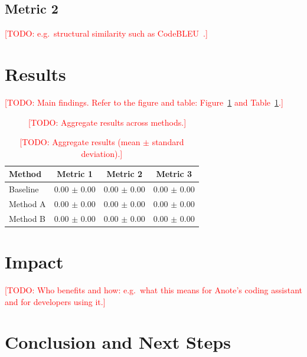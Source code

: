 \documentclass[11pt]{article}
\newcommand{\todo}[1]{\textcolor{red}{[TODO: #1]}}
\begin{document}
\subsection{Metric 2}
\label{sec:eval-metric2}
\todo{e.g.\ structural similarity such as CodeBLEU~\cite{ren2020codebleu}.}

\section{Results}
\label{sec:results}

\todo{Main findings. Refer to the figure and table:
Figure~\ref{fig:results} and Table~\ref{tab:results}.}

\begin{figure}[ht]
  \centering
  \caption{\todo{Aggregate results across methods.}}
  \label{fig:results}
\end{figure}

\begin{table}[ht]
  \centering
  \caption{\todo{Aggregate results (mean $\pm$ standard deviation).}}
  \label{tab:results}
  \begin{tabular}{lccc}
    \toprule
    Method     & Metric 1        & Metric 2        & Metric 3        \\
    \midrule
    Baseline   & 0.00 $\pm$ 0.00 & 0.00 $\pm$ 0.00 & 0.00 $\pm$ 0.00 \\
    Method A   & 0.00 $\pm$ 0.00 & 0.00 $\pm$ 0.00 & 0.00 $\pm$ 0.00 \\
    Method B   & 0.00 $\pm$ 0.00 & 0.00 $\pm$ 0.00 & 0.00 $\pm$ 0.00 \\
    \bottomrule
  \end{tabular}
\end{table}

\section{Impact}
\label{sec:impact}

\todo{Who benefits and how: e.g.\ what this means for Anote's coding
assistant and for developers using it.}

\section{Conclusion and Next Steps}
\label{sec:conclusion}
\end{document}

